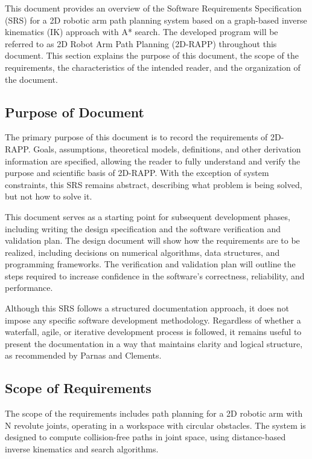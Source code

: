 \documentclass[12pt]{article}
\begin{document}
This document provides an overview of the Software Requirements Specification (SRS) for a 2D robotic arm path planning system based on a graph-based inverse kinematics (IK) approach with A* search. The developed program will be referred to as 2D Robot Arm Path Planning (2D-RAPP) throughout this document. This section explains the purpose of this document, the scope of the requirements, the characteristics of the intended reader, and the organization of the document.

\subsection{Purpose of Document}
The primary purpose of this document is to record the requirements of 2D-RAPP. Goals, assumptions, theoretical models, definitions, and other derivation information are specified, allowing the reader to fully understand and verify the purpose and scientific basis of 2D-RAPP. With the exception of system constraints, this SRS remains abstract, describing what problem is being solved, but not how to solve it.

This document serves as a starting point for subsequent development phases, including writing the design specification and the software verification and validation plan. The design document will show how the requirements are to be realized, including decisions on numerical algorithms, data structures, and programming frameworks. The verification and validation plan will outline the steps required to increase confidence in the software’s correctness, reliability, and performance. 

Although this SRS follows a structured documentation approach, it does not impose any specific software development methodology. Regardless of whether a waterfall, agile, or iterative development process is followed, it remains useful to present the documentation in a way that maintains clarity and logical structure, as recommended by Parnas and Clements.



\subsection{Scope of Requirements} 
The scope of the requirements includes path planning for a 2D robotic arm with N revolute joints, operating in a workspace with circular obstacles. The system is designed to compute collision-free paths in joint space, using distance-based inverse kinematics and search algorithms.
\end{document}
